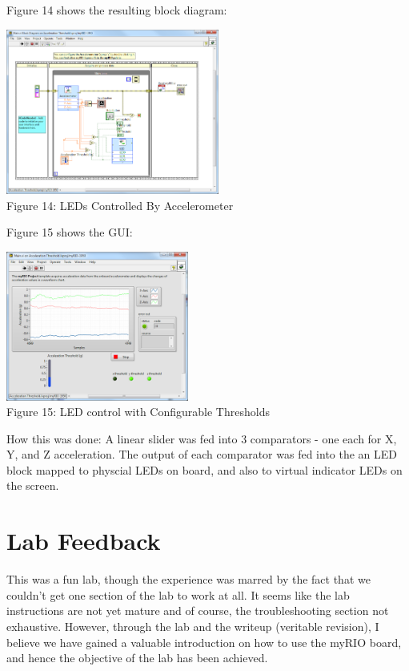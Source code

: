 \documentclass[twoside]{article}
\begin{document}
\begin{multicols}{2}
Figure 14 shows the resulting block diagram:

\begin{center}
\includegraphics*[width = 7cm]{FIG14.png}\\
Figure 14: LEDs Controlled By Accelerometer
\end{center}

Figure 15 shows the GUI: 

\begin{center}
\includegraphics*[width = 6cm]{Fig15.jpg}\\
Figure 15: LED control with Configurable Thresholds
\end{center}

\noindent How this was done: A linear slider was fed into 3 comparators - one each for X, Y, and Z acceleration. The output of each comparator was fed into the an LED block mapped to physcial LEDs on board, and also to virtual indicator LEDs on the screen. 

\section{Lab Feedback}

This was a fun lab, though the experience was marred by the fact that we couldn't get one section of the lab to work at all. It seems like the lab instructions are not yet mature and of course, the troubleshooting section not exhaustive. However, through the lab and the writeup (veritable revision), I believe we have gained a valuable introduction on how to use the myRIO board, and hence the objective of the lab has been achieved. 

\end{multicols}
\end{document}
